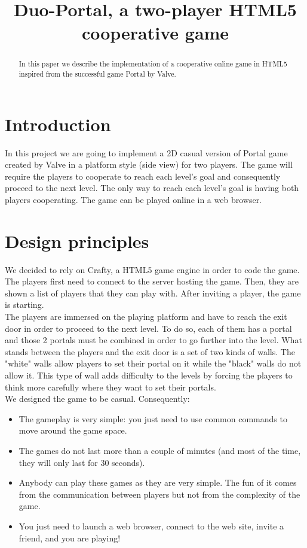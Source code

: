 \documentclass{chi-ext}
\title{Duo-Portal, a two-player HTML5 cooperative game}
\author{
  \alignauthor{
  	\textbf{Frederico Schardong}\\
  	\affaddr{University of Calgary}\\
  	\affaddr{Calgary, CA T2N 1N4 Canada}\\
  	\email{fschardo@ucalgary.ca}
  }\alignauthor{
  	\textbf{Cédric Guillot}\\
  	\affaddr{University of Calgary}\\
  	\affaddr{Calgary, CA T2N 1N4 Canada}\\
  	\email{cpguillo@ucalgary.ca}
  }
}
\def\plaingeneralterms{Cooperative, HTML5, online game, portal}
\begin{document}
\maketitle

\begin{abstract}
In this paper we describe the implementation of a cooperative online game in HTML5 inspired from the successful game Portal by Valve.
\end{abstract}


\terms{\plaingeneralterms}

\section{Introduction}
In this project we are going to implement a 2D casual version of Portal game created by Valve in a platform style (side view) for two players. The game will require the players to cooperate to reach each level’s goal and consequently proceed to the next level. The only way to reach each level’s goal is having both players cooperating. The game can be played online in a web browser.\\

\section{Design principles}
We decided to rely on Crafty, a HTML5 game engine in order to code the game. The players first need to connect to the server hosting the game. Then, they are shown a list of players that they can play with. After inviting a player, the game is starting.\\
The players are immersed on the playing platform and have to reach the exit door in order to proceed to the next level. To do so, each of them has a portal and those 2 portals must be combined in order to go further into the level. What stands between the players and the exit door is a set of two kinds of walls. The "white" walls allow players to set their portal on it while the "black" walls do not allow it. This type of wall adds difficulty to the levels by forcing the players to think more carefully where they want to set their portals.\\
We designed the game to be casual. Consequently:\\
\begin{itemize}
\item The gameplay is very simple: you just need to use common commands to move around the game space.
\item The games do not last more than a couple of minutes (and most of the time, they will only last for 30 seconds).
\item Anybody can play these games as they are very simple. The fun of it comes from the communication between players but not from the complexity of the game.
\item You just need to launch a web browser, connect to the web site, invite a friend, and you are playing!
\end{itemize}
\end{document}
